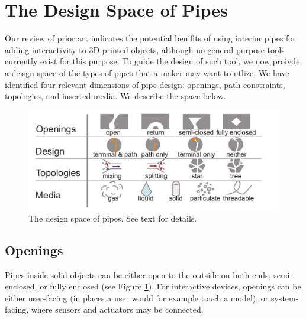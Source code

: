 
\section{The Design Space of Pipes}
Our review of prior art indicates the potential benifits of using interior pipes for adding interactivity to 3D printed objects, although no general purpose tools currently exist for this purpose. To guide the design of such tool, we now proivde a deisgn space of the types of pipes that a maker may want to utlize. We have identified four relevant dimensions of pipe design: openings, path constraints, topologies, and inserted media.  We describe the space below.

\begin{figure}[t]
\centering
    \includegraphics[width=1.0\columnwidth]{figures/tubespace.pdf}
\caption{The design space of pipes.  See text for details. }
\label{fig:pipespace}
\end{figure}

\subsection{Openings}
Pipes inside solid objects can be either open to the outside on both ends, semi-enclosed, or fully enclosed (see Figure \ref{fig:pipespace}). For interactive devices, openings can be either user-facing (in places a user would for example touch a model); or system-facing, where sensors and actuators may be connected.

